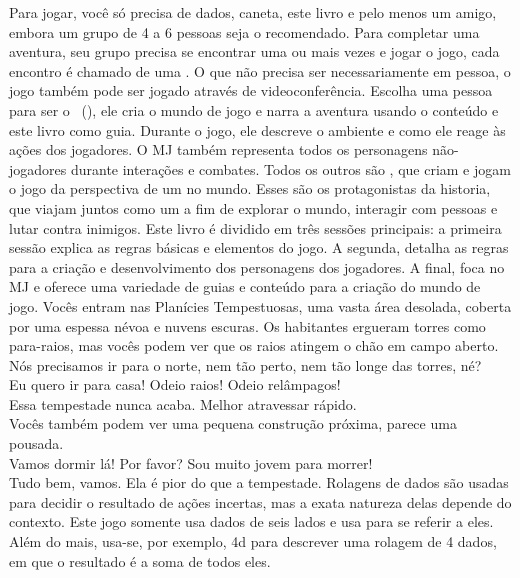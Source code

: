 Para jogar, você só precisa de dados, caneta, este livro e pelo menos um amigo, embora um grupo de 4 a 6 pessoas seja o recomendado. Para completar uma aventura, seu grupo precisa se encontrar uma ou mais vezes e jogar o jogo, cada encontro é chamado de uma .
O que não precisa ser necessariamente em pessoa, o jogo também pode ser jogado através de videoconferência.
%
\ofpar
%
Escolha uma pessoa para ser o ~(), ele cria o mundo de jogo e narra a aventura usando o conteúdo e este livro como guia. 
Durante o jogo, ele descreve o ambiente e como ele reage às ações dos jogadores.
O MJ também representa todos os personagens não-jogadores durante interações e combates.
Todos os outros são , que criam e jogam o jogo da perspectiva de um  no mundo. 
Esses são os protagonistas da historia, que viajam juntos como um   a fim de explorar o mundo, interagir com pessoas e lutar contra inimigos. 
Este livro é dividido em três sessões principais: a primeira sessão explica as regras básicas e elementos do jogo. 
A segunda, detalha as regras para a criação e desenvolvimento dos personagens dos jogadores. 
A final, foca no MJ e oferece uma variedade de guias e conteúdo para a criação do mundo de jogo.
%
\vfill
%
{
	\newcommand{\nl}{\vspace{0.2cm}\\}
	 Vocês entram nas Planícies Tempestuosas, uma vasta área desolada, coberta por uma espessa névoa e nuvens escuras. Os habitantes ergueram torres como para-raios, mas vocês podem ver que os raios atingem o chão em campo aberto.\nl
	 Nós precisamos ir para o norte, nem tão perto, nem tão longe das torres, né?\nl
	 Eu quero ir para casa! Odeio raios! Odeio relâmpagos!\nl
	 Essa tempestade nunca acaba. Melhor atravessar rápido.\nl
	 Vocês também podem ver uma pequena construção próxima, parece uma pousada.\nl
	 Vamos dormir lá! Por favor? Sou muito jovem para morrer!\nl
	 Tudo bem, vamos. Ela é pior do que a tempestade.
}
%
\vfill
%
	Rolagens de dados são usadas para decidir o resultado de ações incertas, mas a exata natureza delas depende do contexto. 
	Este jogo somente usa dados de seis lados e usa  para se referir a eles. 
	Além do mais, usa-se, por exemplo, 4d para descrever uma rolagem de 4 dados, em que o resultado é a soma de todos eles.
